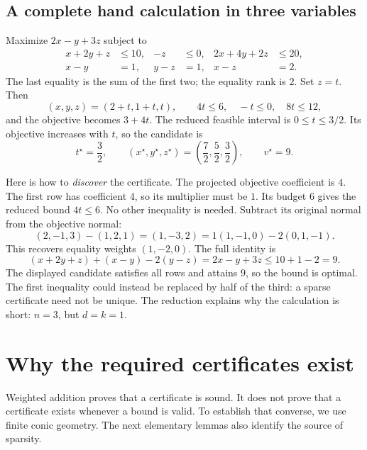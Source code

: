 \documentclass[11pt,letterpaper]{article}
\theoremstyle{definition}
\theoremstyle{remark}
\numberwithin{equation}{section}
\begin{document}
\subsection{A complete hand calculation in three variables}

Maximize \(2x-y+3z\) subject to
\begin{align*}
 x+2y+z&\le10,& -z&\le0,&2x+4y+2z&\le20,\\
 x-y&=1,&y-z&=1,&x-z&=2.
\end{align*}
The last equality is the sum of the first two; the equality rank is \(2\).
Set \(z=t\). Then
\[
 (x,y,z)=(2+t,1+t,t),\qquad
 4t\le6,\quad -t\le0,\quad8t\le12,
\]
and the objective becomes \(3+4t\). The reduced feasible interval is
\(0\le t\le3/2\). Its objective increases with \(t\), so the candidate is
\[
 t^\star=\frac32,\qquad
 (x^\star,y^\star,z^\star)=\left(\frac72,\frac52,\frac32\right),
 \qquad v^\star=9.
\]

Here is how to \emph{discover} the certificate. The projected objective
coefficient is \(4\). The first row has coefficient \(4\), so its multiplier
must be \(1\). Its budget \(6\) gives the reduced bound \(4t\le6\).
No other inequality is needed. Subtract its original normal from the
objective normal:
\[
 (2,-1,3)-(1,2,1)=(1,-3,2)
       =1(1,-1,0)-2(0,1,-1).
\]
This recovers equality weights \((1,-2,0)\). The full identity is
\begin{equation}\label{eq:three-example}
 (x+2y+z)+(x-y)-2(y-z)=2x-y+3z\le10+1-2=9.
\end{equation}
The displayed candidate satisfies all rows and attains \(9\), so the bound is
optimal. The first inequality could instead be replaced by half of the third:
a sparse certificate need not be unique. The reduction explains why the
calculation is short: \(n=3\), but \(d=k=1\).

\section{Why the required certificates exist}
\label{sec:existence}

Weighted addition proves that a certificate is sound. It does not prove that
a certificate exists whenever a bound is valid. To establish that converse,
we use finite conic geometry. The next elementary lemmas also identify the
source of sparsity.
\end{document}
